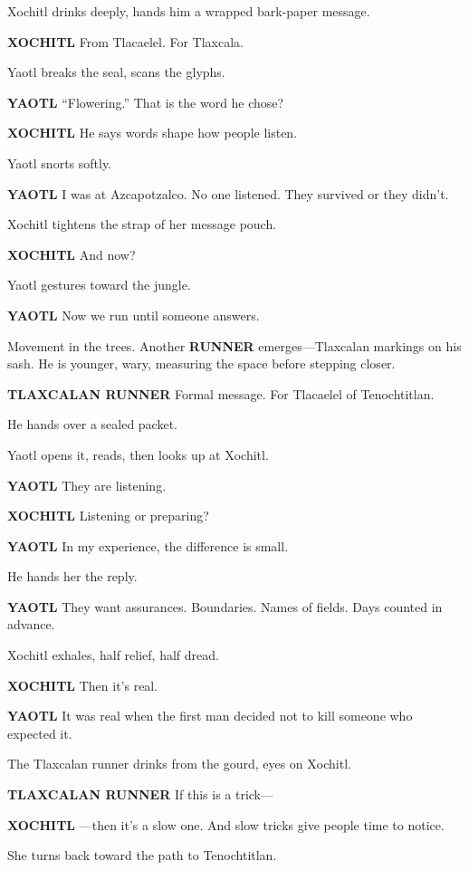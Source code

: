 \documentclass[12pt]{article}
\begin{document}
Xochitl drinks deeply, hands him a wrapped bark-paper message.

\textbf{XOCHITL}  
From Tlacaelel.  
For Tlaxcala.

Yaotl breaks the seal, scans the glyphs.

\textbf{YAOTL}  
“Flowering.”  
That is the word he chose?

\textbf{XOCHITL}  
He says words shape how people listen.

Yaotl snorts softly.

\textbf{YAOTL}  
I was at Azcapotzalco.  
No one listened. They survived or they didn’t.

Xochitl tightens the strap of her message pouch.

\textbf{XOCHITL}  
And now?

Yaotl gestures toward the jungle.

\textbf{YAOTL}  
Now we run until someone answers.

Movement in the trees. Another \textbf{RUNNER} emerges—Tlaxcalan markings on his sash. He is younger, wary, measuring the space before stepping closer.

\textbf{TLAXCALAN RUNNER}  
Formal message.  
For Tlacaelel of Tenochtitlan.

He hands over a sealed packet.

Yaotl opens it, reads, then looks up at Xochitl.

\textbf{YAOTL}  
They are listening.

\textbf{XOCHITL}  
Listening or preparing?

\textbf{YAOTL}  
In my experience, the difference is small.

He hands her the reply.

\textbf{YAOTL}  
They want assurances.  
Boundaries.  
Names of fields.  
Days counted in advance.

Xochitl exhales, half relief, half dread.

\textbf{XOCHITL}  
Then it’s real.

\textbf{YAOTL}  
It was real when the first man decided  
not to kill someone who expected it.

The Tlaxcalan runner drinks from the gourd, eyes on Xochitl.

\textbf{TLAXCALAN RUNNER}  
If this is a trick—

\textbf{XOCHITL}  
—then it’s a slow one.  
And slow tricks give people time to notice.

She turns back toward the path to Tenochtitlan.
\end{document}
